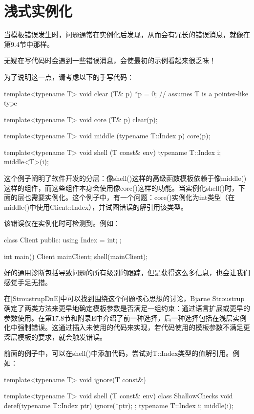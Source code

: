 \section{浅式实例化}
当模板错误发生时，问题通常在实例化后发现，从而会有冗长的错误消息，就像在第9.4节中那样。

\begin{notice}
无疑在写代码时会遇到一些错误消息，会使最初的示例看起来很乏味！
\end{notice}

为了说明这一点，请考虑以下的手写代码：

\begin{cpp}
template<typename T>
void clear (T& p) {
	*p = 0; // assumes T is a pointer-like type
}

template<typename T>
void core (T& p) {
	clear(p);
}

template<typename T>
void middle (typename T::Index p) {
	core(p);
}

template<typename T>
void shell (T const& env) {
	typename T::Index i;
	middle<T>(i);
}
\end{cpp}

这个例子阐明了软件开发的分层：像shell()这样的高级函数模板依赖于像middle()这样的组件，而这些组件本身会使用像core()这样的功能。当实例化shell()时，下面的层也需要实例化。这个例子中，有一个问题：core()实例化为int类型（在middle()中使用Client::Index），并试图错误的解引用该类型。

该错误仅在实例化时可检测到。例如：

\begin{cpp}
class Client {
	public:
	using Index = int;
};

int main() {
	Client mainClient;
	shell(mainClient);
}
\end{cpp}

好的通用诊断包括导致问题的所有级别的跟踪，但是获得这么多信息，也会让我们感觉手足无措。

在[StroustrupDnE]中可以找到围绕这个问题核心思想的讨论，Bjarne Stroustrup确定了两类方法来更早地确定模板参数是否满足一组约束：通过语言扩展或更早的参数使用。在第17.8节和附录E中介绍了前一种选择，后一种选择包括在浅层实例化中强制错误。这通过插入未使用的代码来实现，若代码使用的模板参数不满足更深层模板的要求，就会触发错误。

前面的例子中，可以在shell()中添加代码，尝试对T::Index类型的值解引用。例如：

\begin{cpp}
template<typename T>
void ignore(T const&) { }

template<typename T>
void shell (T const& env) {
	class ShallowChecks
	{
		void deref(typename T::Index ptr) {
			ignore(*ptr);
		}
	};
	typename T::Index i;
	middle(i);
}
\end{cpp}

